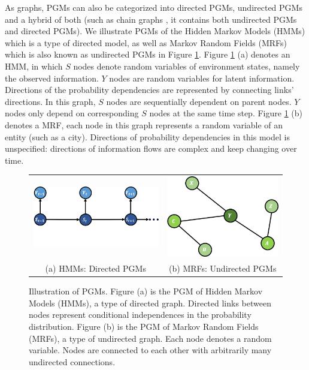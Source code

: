 As graphs, PGMs can also be categorized into directed PGMs,
undirected PGMs and a hybrid of both (such as chain graphs
\cite{lauritzen1989graphical,frydenberg1990chain}, it contains
both undirected PGMs and directed PGMs). We illustrate PGMs of
the Hidden Markov Models \cite{eddy1996hidden} (HMMs) which is a
type of directed model, as well as Markov Random Fields
\cite{Hammersley:1971} (MRFs) which is also known as undirected
PGMs \cite{bishop:2006:PRML} in Figure \ref{fig:intro_hmm_mrf}.
Figure \ref{fig:intro_hmm_mrf} (a) denotes an HMM, in which $S$
nodes denote random variables of environment states, namely the
observed information. $Y$ nodes are random variables for latent
information. Directions of the probability dependencies are
represented by connecting links' directions. In this graph, $S$
nodes are sequentially dependent on parent nodes. $Y$ nodes only
depend on corresponding $S$ nodes at the same time step. Figure
\ref{fig:intro_hmm_mrf} (b) denotes a MRF, each node in this
graph represents a random variable of an entity (such as a city).
Directions of probability dependencies in this model is
unspecified: directions of information flows are complex and keep
changing over time.
\begin{figure}[h]
  \centering
  \begin{tabular}{cc}
    \includegraphics[width=0.5\linewidth]{figures/HMM.png} &
                                                             \includegraphics[width=0.4\linewidth]{figures/MRF.png}\\
    {\small (a) HMMs: Directed PGMs}& {\small (b) MRFs: Undirected PGMs}\\
  \end{tabular}
  \caption{\label{fig:intro_hmm_mrf} Illustration of PGMs. Figure
    (a) is the PGM of Hidden Markov Models (HMMs), a type of
    directed graph. Directed links between nodes represent
    conditional independences in the probability distribution.
    Figure (b) is the PGM of Markov Random Fields (MRFs), a type
    of undirected graph. Each node denotes a random variable.
    Nodes are connected to each other with arbitrarily many
    undirected connections.}
\end{figure}

